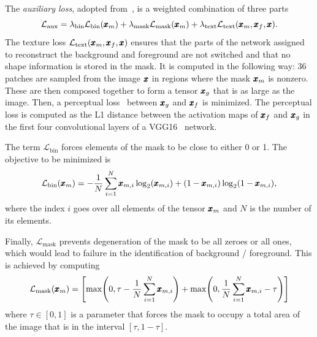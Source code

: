 The \emph{auxiliary loss}, adopted from~\cite{sauer2021counterfactual}, is a weighted combination of three parts
\begin{equation} \label{eq:auxloss}
    \mathcal{L}_{\text{aux}} = \lambda_{\text{bin}}\mathcal{L}_{\text{bin}}(\pmb{{x}}_m) + \lambda_{\text{mask}}\mathcal{L}_{\text{mask}}(\pmb{{x}}_m) + \lambda_{\text{text}}\mathcal{L}_{\text{text}}(\pmb{{x}}_m,\pmb{{x}}_f,\pmb{{x}}).
\end{equation} 
The texture loss $\mathcal{L}_{\text{text}}(\pmb{{x}}_m,\pmb{{x}}_f,\pmb{{x}})$ ensures that the parts of the network assigned to reconstruct the background and foreground are not switched and that no shape information is stored in the mask. It is computed in the following way: 36 patches are sampled from the image $\pmb{{x}}$ in regions where the mask $\pmb{{x}}_m$ is nonzero. These are then composed together to form a tensor $\pmb{{x}}_g$ that is as large as the image. Then, a perceptual loss~\cite{johnson2016perceptual} between $\pmb{{x}}_g$ and $\pmb{{x}}_f$ is minimized. The perceptual loss is computed as the L1 distance between the activation maps of $\pmb{{x}}_f$ and $\pmb{{x}}_g$ in the first four convolutional layers of a VGG16~\cite{simonyan2014very} network.

The term $\mathcal{L}_{\text{bin}}$ forces elements of the mask to be close to either 0 or 1. The objective to be minimized is
\begin{equation}
    \mathcal{L}_{\text{bin}}(\pmb{{x}}_m) = - \frac{1}{N} \sum_{i=1}^N \pmb{{x}}_{m,i} \log_2(\pmb{{x}}_{m,i}) + (1-\pmb{{x}}_{m,i}) \log_2(1 - \pmb{{x}}_{m,i}),
\end{equation}
where the index $i$ goes over all elements of the tensor $\pmb{{x}}_m$ and $N$ is the number of its elements.

 Finally, $\mathcal{L}_{\text{mask}}$ prevents degeneration of the mask to be all zeroes or all ones, which would lead to failure in the identification of background / foreground. This is achieved by computing
  \begin{equation}
    \mathcal{L}_{\text{mask}}(\vc{x}_m) = \left[ \max \left( 0, \tau - \frac{1}{N} \sum_{i=1}^N \vc{x}_{m,i} \right) + \max \left( 0, \frac{1}{N} \sum_{i=1}^N \vc{x}_{m,i} -\tau  \right) \right]
\end{equation}
where $\tau \in [0,1]$ is a parameter that forces the mask to occupy a total area of the image that is in the interval $[\tau, 1-\tau]$. 

